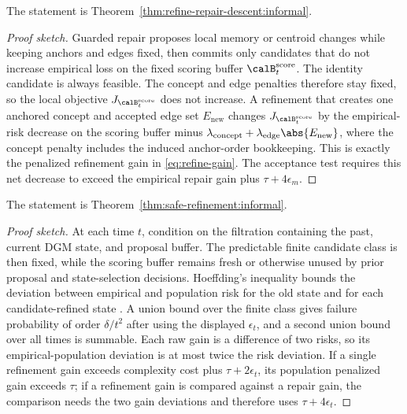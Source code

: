 \begin{theorem}
\label{thm:refine-repair-descent:sketch}
The statement is Theorem~\ref{thm:refine-repair-descent:informal}.
\end{theorem}
\begin{proof}[Proof sketch]
Guarded repair proposes local memory or centroid changes while keeping anchors and edges fixed, then commits only candidates that do not increase empirical loss on the fixed scoring buffer $\calB_t^{\mathrm{score}}$. The identity candidate is always feasible. The concept and edge penalties therefore stay fixed, so the local objective $J_{\calB_t^{\mathrm{score}}}$ does not increase. A refinement that creates one anchored concept and accepted edge set $E_{\mathrm{new}}$ changes $J_{\calB_t^{\mathrm{score}}}$ by the empirical-risk decrease on the scoring buffer minus $\lambda_{\mathrm{concept}}+\lambda_{\mathrm{edge}}\abs{E_{\mathrm{new}}}$, where the concept penalty includes the induced anchor-order bookkeeping. This is exactly the penalized refinement gain in \eqref{eq:refine-gain}. The acceptance test requires this net decrease to exceed the empirical repair gain plus $\tau+4\epsilon_m$.
\end{proof}

\begin{theorem}
\label{thm:safe-refinement:sketch}
The statement is Theorem~\ref{thm:safe-refinement:informal}.
\end{theorem}
\begin{proof}[Proof sketch]
At each time $t$, condition on the filtration containing the past, current DGM state, and proposal buffer. The predictable finite candidate class is then fixed, while the scoring buffer remains fresh or otherwise unused by prior proposal and state-selection decisions. Hoeffding's inequality bounds the deviation between empirical and population risk for the old state and for each candidate-refined state \citep{hoeffding1963probability}. A union bound over the finite class gives failure probability of order $\delta/t^2$ after using the displayed $\epsilon_t$, and a second union bound over all times is summable. Each raw gain is a difference of two risks, so its empirical-population deviation is at most twice the risk deviation. If a single refinement gain exceeds complexity cost plus $\tau+2\epsilon_t$, its population penalized gain exceeds $\tau$; if a refinement gain is compared against a repair gain, the comparison needs the two gain deviations and therefore uses $\tau+4\epsilon_t$.
\end{proof}

